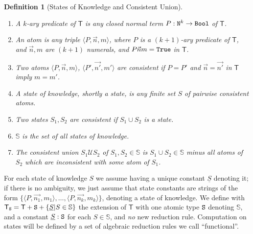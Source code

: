 \documentclass[copyright,creativecommons]{eptcs}
\newcommand{\Nat}                      { {\tt N} }
\newcommand{\Bool}                     { {\tt Bool} }
\newcommand{\State}                    { {\tt S} }
\newcommand{\StateSet}                 {\mathbb{S}}
\newcommand{\SystemT}                  {\mathsf{T}}
\newcommand{\True}                     { {\tt{True}} }
\newcommand{\SystemTState}             {\SystemT_\State}
\newcommand{\CupSem}                   { {\mathcal U} }
\newcommand{\makestate}      [1]       { {\underline{#1}} }
\newtheorem{definition}{Definition}
\begin{document}
\begin{definition} [States of Knowledge and Consistent Union]\label{definition-StateOfKnowledge}\begin{enumerate}
\item
A $k$-ary {\em predicate} of $\SystemT$ is any closed normal term $P:\Nat^{k}\rightarrow \Bool$ of $\SystemT$.

\item
An atom is any triple $\langle P,\vec{n},{m}\rangle $, where $P$ is a $(k+1)$-ary predicate of $\SystemT$, and $\vec{n},m$ are $(k+1)$ numerals, and $P\vec{n}m = \True$ in $\SystemT$.

\item
Two atoms $\langle P,\vec{n},{m}\rangle $, $\langle P',\vec{n'},{m'}\rangle $ are {\em consistent} if $P = P'$ and $\vec{n} = \vec{n'}$ in $\SystemT$ imply $m = m'$.


\item
A state of knowledge, shortly a {\em state}, is any finite set $S$ of pairwise consistent atoms.

\item
Two states $S_1, S_2$ are consistent if $S_1 \cup S_2$ is a state.

\item
$\StateSet$ is the set of all states of knowledge.
\item
The {\em consistent union} $S_1 \CupSem S_2$ of $S_1, S_2 \in \StateSet$ is $S_1 \cup S_2 \in \StateSet$ minus all atoms of $S_2$ which are inconsistent with some atom of $S_1$.
\end{enumerate}
\end{definition}
For each state of knowledge $S$ we assume having a unique constant $ \makestate{S}$ denoting it; if there is no ambiguity, we just assume that state constants are strings of the form $\{\langle P,\vec{n_1},m_1\rangle,\ldots, \langle P, \vec{n_k}, m_k\rangle\}$, denoting a state of knowledge. We define with $\SystemTState  = \SystemT + \State + \{\makestate{S}|S \in \StateSet\}$ the extension of $\SystemT$ with one atomic type $\State$ denoting $\StateSet$, and a constant $ \makestate{S} : \State$ for each $S \in \StateSet$, and {\em no} new reduction rule. Computation on states will be defined by a set of algebraic reduction rules we call ``functional''.
\end{document}
